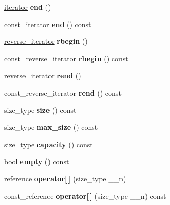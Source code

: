 \begin{DoxyCompactItemize}
\hyperlink{structiterator}{iterator} {\bfseries end} ()
\item 
\mbox{\label{structvector_a1fa209a2ebabb1df947fcd4adde9783f}} 
const\+\_\+iterator {\bfseries end} () const
\item 
\mbox{\label{structvector_a3ee188b5bf6c595bc18f8a0123d48f56}} 
\hyperlink{classreverse__iterator}{reverse\+\_\+iterator} {\bfseries rbegin} ()
\item 
\mbox{\label{structvector_a9f4fbafdb86447543b9b792d6be451c7}} 
const\+\_\+reverse\+\_\+iterator {\bfseries rbegin} () const
\item 
\mbox{\label{structvector_aab8dc03aa6d6888f249e8475578892dd}} 
\hyperlink{classreverse__iterator}{reverse\+\_\+iterator} {\bfseries rend} ()
\item 
\mbox{\label{structvector_a8a35a4bf7f3200747702d1188ba25afb}} 
const\+\_\+reverse\+\_\+iterator {\bfseries rend} () const
\item 
\mbox{\label{structvector_a9e99025ce65ac17571d8707bcb5af9c8}} 
size\+\_\+type {\bfseries size} () const
\item 
\mbox{\label{structvector_a43dfb7e0a66435621fa9018cffb79ac1}} 
size\+\_\+type {\bfseries max\+\_\+size} () const
\item 
\mbox{\label{structvector_a53e2ba58c4c130fd560f526637a2154b}} 
size\+\_\+type {\bfseries capacity} () const
\item 
\mbox{\label{structvector_ab9a783d8d91734251c0b46c6adf20180}} 
bool {\bfseries empty} () const
\item 
\mbox{\label{structvector_a62f3e2125fac1d84617c6b33c128843a}} 
reference {\bfseries operator\mbox{[}$\,$\mbox{]}} (size\+\_\+type \+\_\+\+\_\+n)
\item 
\mbox{\label{structvector_acac936491ad02cb1e4c218399f380545}} 
const\+\_\+reference {\bfseries operator\mbox{[}$\,$\mbox{]}} (size\+\_\+type \+\_\+\+\_\+n) const
\item 

\end{DoxyCompactItemize}
